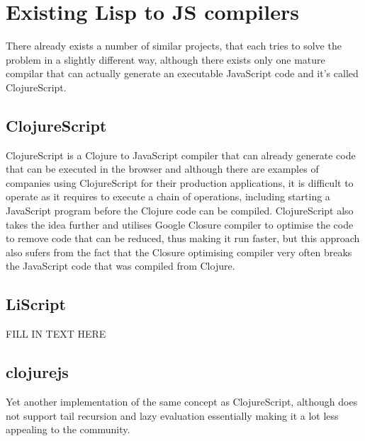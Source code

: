 \section{Existing Lisp to JS compilers}
There already exists a number of similar projects, that each tries to solve the problem in a slightly different way, although there exists only one mature compilar that can actually generate an executable JavaScript code and it's called ClojureScript.

\subsection{ClojureScript}
ClojureScript is a Clojure to JavaScript compiler that can already generate code that can be executed in the browser and although there are examples of companies using ClojureScript for their production applications, it is difficult to operate as it requires to execute a chain of operations, including starting a JavaScript program before the Clojure code can be compiled.
ClojureScript also takes the idea further and utilises Google Closure compiler to optimise the code to remove code that can be reduced, thus making it run faster, but this approach also sufers from the fact that the Closure optimising compiler very often breaks the JavaScript code that was compiled from Clojure.

\subsection{LiScript}
FILL IN TEXT HERE

\subsection{clojurejs}
Yet another implementation of the same concept as ClojureScript, although does not support tail recursion and lazy evaluation essentially making it a lot less appealing to the community.
